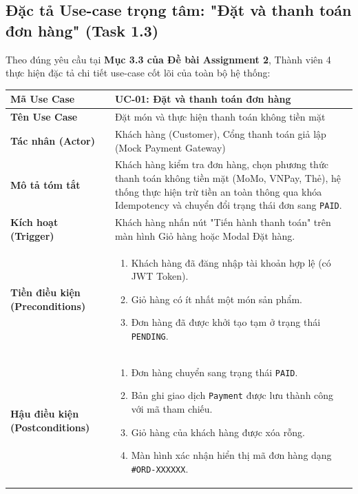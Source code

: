 \documentclass[a4paper]{article}
\begin{document}
\subsection{Đặc tả Use-case trọng tâm: "Đặt và thanh toán đơn hàng" (Task 1.3)}
Theo đúng yêu cầu tại \textbf{Mục 3.3 của Đề bài Assignment 2}, Thành viên 4 thực hiện đặc tả chi tiết use-case cốt lõi của toàn bộ hệ thống:

\begin{table}[h!]
\centering
\small
\begin{tabular}{|p{3.5cm}|p{11.5cm}|}
\hline
\textbf{Mã Use Case} & \textbf{UC-01: Đặt và thanh toán đơn hàng} \\ \hline
\textbf{Tên Use Case} & Đặt món và thực hiện thanh toán không tiền mặt \\ \hline
\textbf{Tác nhân (Actor)} & Khách hàng (Customer), Cổng thanh toán giả lập (Mock Payment Gateway) \\ \hline
\textbf{Mô tả tóm tắt} & Khách hàng kiểm tra đơn hàng, chọn phương thức thanh toán không tiền mặt (MoMo, VNPay, Thẻ), hệ thống thực hiện trừ tiền an toàn thông qua khóa Idempotency và chuyển đổi trạng thái đơn sang \texttt{PAID}. \\ \hline
\textbf{Kích hoạt (Trigger)} & Khách hàng nhấn nút "Tiến hành thanh toán" trên màn hình Giỏ hàng hoặc Modal Đặt hàng. \\ \hline
\textbf{Tiền điều kiện (Preconditions)} & 
\begin{enumerate}
    \vspace{-0.2cm}
    \item Khách hàng đã đăng nhập tài khoản hợp lệ (có JWT Token).
    \item Giỏ hàng có ít nhất một món sản phẩm.
    \item Đơn hàng đã được khởi tạo tạm ở trạng thái \texttt{PENDING}.
    \vspace{-0.2cm}
\end{enumerate} \\ \hline
\textbf{Hậu điều kiện (Postconditions)} & 
\begin{enumerate}
    \vspace{-0.2cm}
    \item Đơn hàng chuyển sang trạng thái \texttt{PAID}.
    \item Bản ghi giao dịch \texttt{Payment} được lưu thành công với mã tham chiếu.
    \item Giỏ hàng của khách hàng được xóa rỗng.
    \item Màn hình xác nhận hiển thị mã đơn hàng dạng \texttt{\#ORD-XXXXXX}.

\end{enumerate}
\end{tabular}
\end{table}
\end{document}
